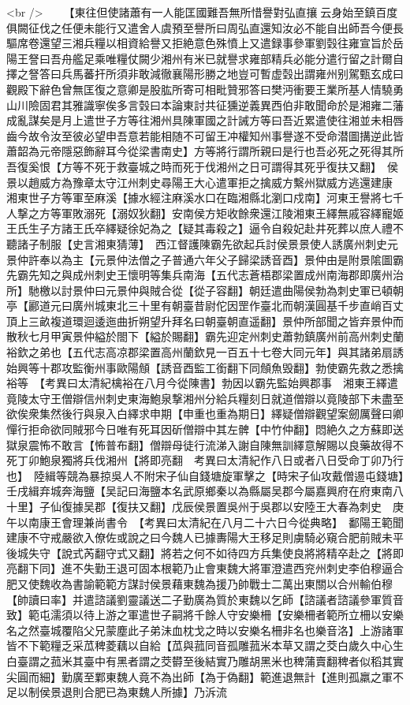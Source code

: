 <br />
　　【東往但使諸蕭有一人能匡國難吾無所惜譽對弘直攘云身始至鎮百度俱闕征伐之任便未能行又遣舍人虞預至譽所曰周弘直還知汝必不能自出師吾今便長驅席卷還望三湘兵糧以相資給譽又拒絶意色殊憤上又遣録事參軍劉㲄往雍宣旨於岳陽王詧曰吾舟艦足乘唯糧仗闕少湘州有米已就譽求雍部精兵必能分遣行留之計爾自擇之詧答曰兵馬蕃扞所須非敢減徹襄陽形勝之地豈可暫虚㲄出謂雍州别駕甄玄成曰觀殿下辭色曾無匡復之意卿是股肱所寄可相毗贊邪答曰樊沔衝要王業所基人情驍勇山川險固君其雅識寧俟多言㲄曰本論東討共征獯逆義異西伯非敢聞命於是湘雍二藩成亂謀矣是月上遣世子方等往湘州具陳軍國之計誡方等曰吾近累遣使往湘並未相唇齒今故令汝至彼必望申吾意若能相随不可留王冲權知州事譽遂不受命潜圖搆逆此皆蕭韶為元帝隱惡飾辭耳今從梁書南史】方等將行謂所親曰是行也吾必死之死得其所吾復奚恨【方等不死于救臺城之時而死于伐湘州之日可謂得其死乎復扶又翻】　侯景以趙威方為豫章太守江州刺史尋陽王大心遣軍拒之擒威方繫州獄威方逃還建康　湘東世子方等軍至麻溪【據水經注麻溪水口在臨湘縣北瀏口戍南】河東王譽將七千人撃之方等軍敗溺死【溺奴狄翻】安南侯方矩收餘衆還江陵湘東王繹無戚容繹寵姬王氏生子方諸王氏卒繹疑徐妃為之【疑其毒殺之】逼令自殺妃赴井死葬以庶人禮不聽諸子制服【史言湘東猜薄】　西江督護陳霸先欲起兵討侯景景使人誘廣州刺史元景仲許奉以為主【元景仲法僧之子普通六年父子歸梁誘音酉】景仲由是附景隂圖霸先霸先知之與成州刺史王懷明等集兵南海【五代志蒼梧郡梁置成州南海郡即廣州治所】馳檄以討景仲曰元景仲與賊合從【從子容翻】朝廷遣曲陽侯勃為刺史軍已頓朝亭【酈道元曰廣州城東北三十里有朝臺昔尉佗因罡作臺北而朝漢圓基千步直峭百丈頂上三畝複道環迴逶迤曲折朔望升拜名曰朝臺朝直遥翻】景仲所部聞之皆弃景仲而散秋七月甲寅景仲縊於閤下【縊於賜翻】霸先迎定州刺史蕭勃鎮廣州前高州刺史蘭裕欽之弟也【五代志高凉郡梁置高州蘭欽見一百五十七卷大同元年】與其諸弟扇誘始興等十郡攻監衡州事歐陽頠【誘音酉監工銜翻下同頠魚毁翻】勃使霸先救之悉擒裕等　【考異曰太清紀檎裕在八月今從陳書】勃因以霸先監始興郡事　湘東王繹遣竟陵太守王僧辯信州刺史東海鮑泉撃湘州分給兵糧刻日就道僧辯以竟陵部下未盡至欲俟衆集然後行與泉入白繹求申期【申重也重為期日】繹疑僧辯觀望案劒厲聲曰卿憚行拒命欲同賊邪今日唯有死耳因斫僧辯中其左髀【中竹仲翻】悶絶久之方蘇即送獄泉震怖不敢言【怖普布翻】僧辯母徒行流涕入謝自陳無訓繹意解賜以良藥故得不死丁卯鮑泉獨將兵伐湘州【將即亮翻　考異曰太清紀作八日或者八日受命丁卯乃行也】　陸緝等競為暴掠吳人不附宋子仙自錢塘旋軍擊之【時宋子仙攻戴僧逷屯錢塘】壬戌緝弃城奔海鹽【吴記曰海鹽本名武原鄉秦以為縣屬吴郡今屬嘉興府在府東南八十里】子仙復據吴郡【復扶又翻】戊辰侯景置吳州于吳郡以安陸王大春為刺史　庚午以南康王會理兼尚書令　【考異曰太清紀在八月二十六日今從典略】　鄱陽王範聞建康不守戒嚴欲入僚佐或說之曰今魏人已據夀陽大王移足則虜騎必窺合肥前賊未平後城失守【說式芮翻守式又翻】將若之何不如待四方兵集使良將將精卒赴之【將即亮翻下同】進不失勤王退可固本根範乃止會東魏大將軍澄遣西兖州刺史李伯穆逼合肥又使魏收為書諭範範方謀討侯景藉東魏為援乃帥戰士二萬出東關以合州輸伯穆【帥讀曰率】并遣諮議劉靈議送二子勤廣為質於東魏以乞師【諮議者諮議參軍質音致】範屯濡須以待上游之軍遣世子嗣將千餘人守安樂柵【安樂柵者範所立柵以安樂名之然臺城覆陷父兄蒙塵此子弟沬血枕戈之時以安樂名柵非名也樂音洛】上游諸軍皆不下範糧乏采苽稗菱藕以自給【苽與菰同音孤雕菰米本草又謂之茭白歲久中心生白臺謂之菰米其臺中有黑者謂之茭欎至後結實乃雕胡黑米也稗蒲賣翻稗者似稻其實尖圓而細】勤廣至鄴東魏人竟不為出師【為于偽翻】範進退無計【進則孤羸之軍不足以制侯景退則合肥已為東魏人所據】乃泝流